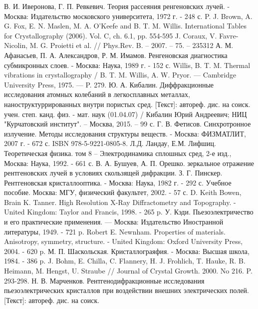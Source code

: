 \begin{thebibliography}{99}
В. И.  Иверонова, Г. П. Ревкевич. Теория рассеяния ренгеновских лучей. -
Москва: Издательство московского университета, 1972 г. - 248 с.
P. J. Brown, A. G. Fox, E. N. Maslen, M. A. O'Keefe and B. T. M. Willis.
International Tables for Crystallography (2006). Vol. C, ch. 6.1, pp. 554-595
J. Coraux, V. Favre-Nicolin, M. G. Proietti et al. // Phys.Rev. B. – 2007. – 75. – 235312
А. М. Афанасьев, П. А. Александров, Р. М. Имамов. Ренгеновская диагностика
субмикронных слоев. - Москва: Наука, 1989 г. - 152 с.
Willis, B. T. M. Thermal vibrations in crystallography /
B. T. M. Willis, A. W. Pryor. — Cambridge University Press, 1975. — P. 279.
Ю. А. Кибалин. Диффракционные исследования атомных колебаний в легкосплавных
металлах, наноструктуррированных внутри пористых сред. [Текст]: автореф. дис. на соиск.
учен. степ. канд. физ. - мат. наук (01.04.07) /
Кибалин Юрий Андреевич; НИЦ "Курчатовский институт". – Москва, 2015. – 99 с.
Г. В. Фетисов. Синхротронное излучение. Методы исследования структуры веществ. -
Москва: ФИЗМАТЛИТ, 2007 г. - 672 с. ISBN 978-5-9221-0805-8.
Л.Д. Ландау, Е.М. Лифшиц. Теоретическая физика. том 8 –
Электродинамика сплошных сред, 2-е изд., Москва: Наука, 1992. - 661 с.
В. А. Бушуев, А. П. Орешко. зеркальное отражение рентгеновских лучей в условиях скользящей дифракции.
З. Г.  Пинскер. Рентгеновская кристаллооптика. - Москва: Наука, 1982 г. - 292 с.
Учебное пособие. Москва: МГУ, физический факультет, 2002. - 57 с.
D. Keith Bowen, Brain K. Tanner. High Resolution X-Ray Diffractometry and Topography. - United Kingdom: Taylor and Francis, 1998. - 265 p.
У. Кэди. Пьезоэлектричество и его практические применения. — Москва: Издательство Иностранной литературы, 1949. - 721 p.
Robert E. Newnham. Properties of materials. Anisotropy, symmetry, structure. - United Kingdom: Oxford University Press, 2004. -  620 p.
М. П. Шаскольская. Кристаллограяфия. - Москва: Высшая школа, 1984. - 386 p.
J. Bohm, E. Chilla, C. Flannery, H. J. Frohlich, T. Hauke, R. B. Heimann, M. Hengst, U. Straube // Journal of Crystal Growth. 2000. No 216. P. 293-298.
Н. В. Марченков. Рентгенодифракционные исследования пьезоэлектрических кристаллов
при воздействии внешних электрических полей. [Текст]: автореф. дис. на соиск.

\end{thebibliography}
